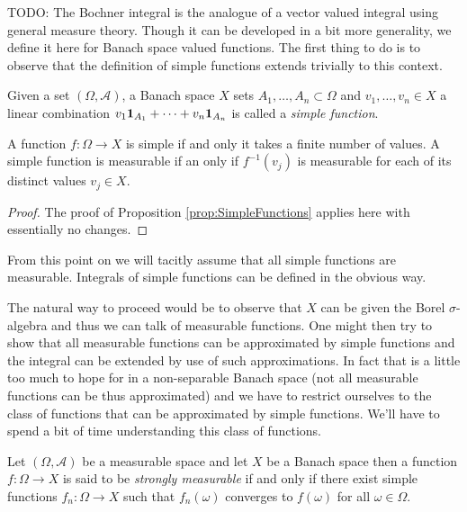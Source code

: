 TODO:
The Bochner integral is the analogue of a vector valued integral using
general measure theory.  Though it can be developed in a bit more
generality, we define it here for Banach space valued functions.  
The first thing to do is to observe that the definition of simple functions
extends trivially to this context.
\begin{defn}Given a set $(\Omega, \mathcal{A})$, a Banach space $X$
  sets $A_1, \dotsc, A_n \subset \Omega$ and $v_1, \dotsc, v_n \in X$ a
  linear combination $v_1
  \textbf{1}_{A_1} + \cdots + v_n \textbf{1}_{A_n}$ is called
  a \emph{simple function}.
\end{defn}

\begin{prop}\label{prop:SimpleVectorValuedFunctions}A function $f : \Omega \to X$ is simple if and only it
  takes a finite number of values.  A simple function is measurable if
  an only if $f^{-1}(v_j)$ is measurable for each of its distinct
  values $v_j \in X$.
\end{prop}
\begin{proof}
The proof of Proposition \ref{prop:SimpleFunctions} applies here with essentially
no changes.
\end{proof}

From this point on we will tacitly assume that all simple functions
are measurable. Integrals of simple functions can be defined in the obvious way.

The natural way to proceed would be to observe that $X$ can be given
the Borel $\sigma$-algebra and thus we can talk of measurable
functions.  One might then try to show that all measurable functions
can be approximated by simple functions and the integral can be
extended by use of such approximations.  In fact that is a little too much to hope for in a
non-separable Banach space (not all measurable functions can be thus
approximated) 
and we have to restrict ourselves to the class of functions that can be approximated
by simple functions.  We'll have to spend a bit of time understanding
this class of functions. 

\begin{defn}Let $(\Omega,\mathcal{A})$ be a measurable space and let
  $X$ be a Banach space then a function $f : \Omega \to X$ is said to
  be \emph{strongly measurable} if and only if there exist simple
  functions $f_n : \Omega \to X$ such that $f_n(\omega)$ converges to 
$f(\omega)$ for  all $\omega \in \Omega$.
\end{defn}

